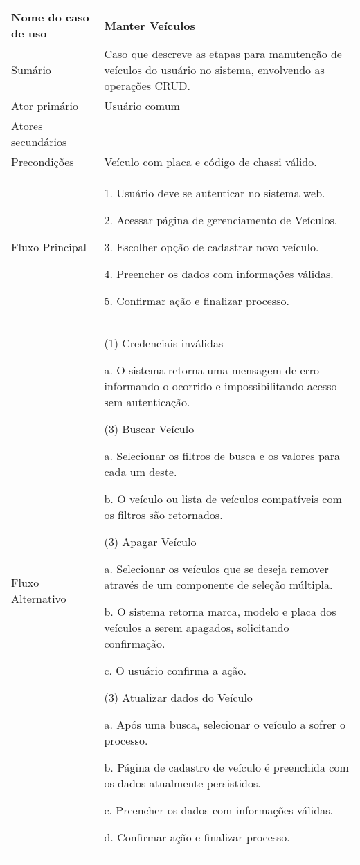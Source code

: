 \begin{flushleft}
\tablefirsthead{}
\tablehead{}
\tabletail{}
\tablelasttail{}
\begin{supertabular}{|m{5.5680003cm}|m{9.325cm}|}
\hline
Nome do caso de uso &
Manter Veículos\\\hline
Sumário &
Caso que descreve as etapas para manutenção de veículos do usuário no sistema, envolvendo as operações CRUD.\\\hline
Ator primário &
Usuário comum\\\hline
Atores secundários &
~
\\\hline
Precondições &
Veículo com placa e código de chassi válido.\\\hline
Fluxo Principal &
1. Usuário deve se autenticar no sistema web.

2. Acessar página de gerenciamento de Veículos.

3. Escolher opção de cadastrar novo veículo.

4. Preencher os dados com informações válidas.

5. Confirmar ação e finalizar processo.\\\hline
Fluxo Alternativo &
(1) Credenciais inválidas

a. O sistema retorna uma mensagem de erro informando o ocorrido e impossibilitando acesso sem autenticação.

(3) Buscar Veículo

a. Selecionar os filtros de busca e os valores para cada um deste.

b. O veículo ou lista de veículos compatíveis com os filtros são retornados.

(3) Apagar Veículo

a. Selecionar os veículos que se deseja remover através de um componente de seleção múltipla.

b. O sistema retorna marca, modelo e placa dos veículos a serem apagados, solicitando confirmação.

c. O usuário confirma a ação.

(3) Atualizar dados do Veículo

a. Após uma busca, selecionar o veículo a sofrer o processo.

b. Página de cadastro de veículo é preenchida com os dados atualmente persistidos.

c. Preencher os dados com informações válidas.

d. Confirmar ação e finalizar processo.


\end{supertabular}
\end{flushleft}
